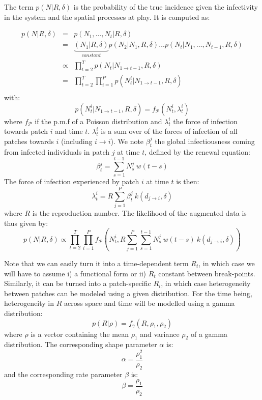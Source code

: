 \documentclass[a4paper,11pt]{article}
\begin{document}
The term $p(N | R, \delta)$ is the probability of the true incidence 
given the infectivity in the system and the spatial processes at play.
It is computed as:

\begin{eqnarray}
p(N | R, \delta) & = & p(N_1, \ldots, N_t | R, \delta)\\
 & = & \underbrace{(N_1| R, \delta)}_{constant} p(N_2| N_1, R, \delta) \ldots 
       p(N_t| N_1, \ldots, N_{t-1}, R, \delta) \\
 & \propto & \prod_{t=2}^T p(N_t| N_{1 \rightarrow t-1}, R, \delta)\\
 & = & \prod_{t=2}^T \prod_{i=1}^P 
       p(N_t^i| N_{1 \rightarrow t-1}, R, \delta)\\
\end{eqnarray}
with:
\begin{equation}
p(N_t^i| N_{1 \rightarrow t-1}, R, \delta) = f_\mathcal{P}(N_t^i, \lambda_t^i)
\end{equation}
where $f_\mathcal{P}$ if the p.m.f of a Poisson distribution and $\lambda_t^i$ 
the force of infection towards patch $i$ and time $t$.
$\lambda_t^i$ is a sum over of the forces of infection of all patches towards $i$ (including $i \rightarrow i$). 
We note $\beta_t^j$ the global infectiousness coming from infected individuals 
in patch $j$ at time $t$, defined by the renewal equation:
\begin{equation}
 \beta_t^j = \sum_{s=1}^{t-1} N_s^j \:  w(t - s)
\end{equation}
The force of infection experienced by patch $i$ at time $t$ is then:
\begin{equation}
\lambda_t^i = R \sum_{j=1}^P \beta_t^j \: k(d_{j\rightarrow i},\delta)
\end{equation}
where $R$ is the reproduction number. 
The likelihood of the augmented data is thus given by:
\begin{equation}
p(N|R, \delta) \propto \prod_{t=2}^T \prod_{i=1}^P 
       f_\mathcal{P}(N_t^i, R 
       \sum_{j=1}^P \sum_{s=1}^{t-1} N_s^j \:  w(t - s) \:
       k(d_{j\rightarrow i},\delta) )
\end{equation}


Note that we can easily turn it into a time-dependent term $R_t$, in which 
case 
we will have to assume i) a functional form or ii) $R_t$ constant 
between break-points. 
Similarly, it can be turned into a patch-specific $R_i$, in which case 
heterogeneity between patches can be modeled using a given distribution.
For the time being, heterogeneity in $R$ across space and time will be modelled 
using a gamma distribution:
\begin{equation}
p(R | \rho) = f_{\gamma} (R, \rho_1, \rho_2)
\end{equation}
where $\rho$ is a vector containing the mean $\rho_1$ and variance
$\rho_2$ of a gamma distribution.
The corresponding shape parameter $\alpha$ is:
\begin{equation}
\alpha = \frac{\rho_1^2}{\rho_2}
\end{equation}
and the corresponding rate parameter $\beta$ is:
\begin{equation}
\beta = \frac{\rho_1}{\rho_2}
\end{equation}
\\
\end{document}
